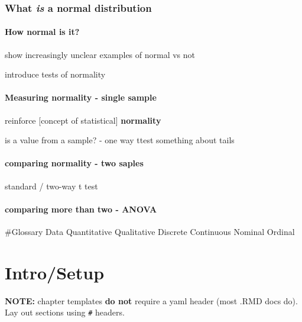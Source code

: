 \documentclass[
]{book}
\begin{document}
\hypertarget{what-is-a-normal-distribution}{%
\subsection{\texorpdfstring{What \emph{is} a \textbf{normal distribution}}{What is a normal distribution}}\label{what-is-a-normal-distribution}}

\hypertarget{how-normal-is-it}{%
\subsubsection{How normal is it?}\label{how-normal-is-it}}

show increasingly unclear examples of normal vs not

introduce tests of normality

\hypertarget{measuring-normality---single-sample}{%
\subsubsection{Measuring normality - single sample}\label{measuring-normality---single-sample}}

reinforce {[}concept of statistical{]} \textbf{normality}

is a value from a sample? - one way ttest
something about tails

\hypertarget{comparing-normality---two-saples}{%
\subsubsection{comparing normality - two saples}\label{comparing-normality---two-saples}}

standard / two-way t test

\hypertarget{comparing-more-than-two---anova}{%
\subsubsection{comparing more than two - ANOVA}\label{comparing-more-than-two---anova}}

\#Glossary
Data
Quantitative
Qualitative
Discrete
Continuous
Nominal
Ordinal

\hypertarget{introsetup}{%
\chapter{Intro/Setup}\label{introsetup}}

\textbf{NOTE:} chapter templates \textbf{do not} require a yaml header (most .RMD docs do). Lay out sections using \texttt{\#} headers.
\end{document}
